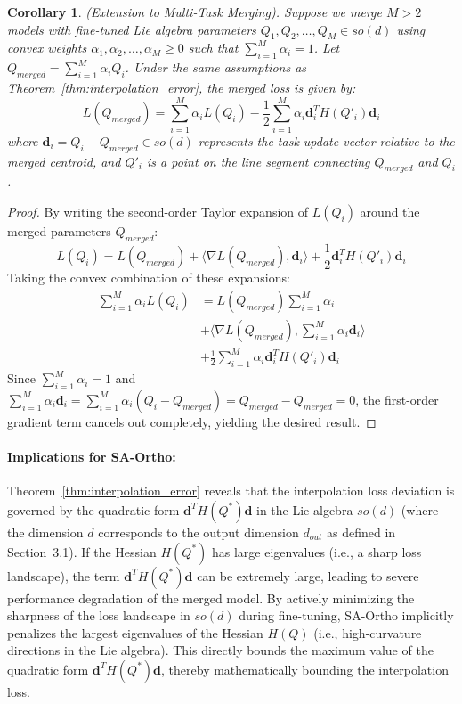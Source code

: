 \documentclass{article}
\theoremstyle{plain}
\newtheorem{corollary}[theorem]{Corollary}
\theoremstyle{definition}
\theoremstyle{remark}
\begin{document}
\begin{corollary}
\label{cor:multi_task_merging}
(Extension to Multi-Task Merging). Suppose we merge $M > 2$ models with fine-tuned Lie algebra parameters $Q_1, Q_2, \ldots, Q_M \in so(d)$ using convex weights $\alpha_1, \alpha_2, \ldots, \alpha_M \ge 0$ such that $\sum_{i=1}^M \alpha_i = 1$. Let $Q_{merged} = \sum_{i=1}^M \alpha_i Q_i$. Under the same assumptions as Theorem~\ref{thm:interpolation_error}, the merged loss is given by:
\begin{equation}
    L(Q_{merged}) = \sum_{i=1}^M \alpha_i L(Q_i) - \frac{1}{2} \sum_{i=1}^M \alpha_i \mathbf{d}_i^T H(Q'_i) \mathbf{d}_i
\end{equation}
where $\mathbf{d}_i = Q_i - Q_{merged} \in so(d)$ represents the task update vector relative to the merged centroid, and $Q'_i$ is a point on the line segment connecting $Q_{merged}$ and $Q_i$.
\end{corollary}

\begin{proof}
By writing the second-order Taylor expansion of $L(Q_i)$ around the merged parameters $Q_{merged}$:
\begin{equation}
    L(Q_i) = L(Q_{merged}) + \langle \nabla L(Q_{merged}), \mathbf{d}_i \rangle + \frac{1}{2} \mathbf{d}_i^T H(Q'_i) \mathbf{d}_i
\end{equation}
Taking the convex combination of these expansions:
\begin{align}
    \sum_{i=1}^M \alpha_i L(Q_i) &= L(Q_{merged}) \sum_{i=1}^M \alpha_i \nonumber \\
    &+ \langle \nabla L(Q_{merged}), \sum_{i=1}^M \alpha_i \mathbf{d}_i \rangle \nonumber \\
    &+ \frac{1}{2} \sum_{i=1}^M \alpha_i \mathbf{d}_i^T H(Q'_i) \mathbf{d}_i
\end{align}
Since $\sum_{i=1}^M \alpha_i = 1$ and $\sum_{i=1}^M \alpha_i \mathbf{d}_i = \sum_{i=1}^M \alpha_i (Q_i - Q_{merged}) = Q_{merged} - Q_{merged} = 0$, the first-order gradient term cancels out completely, yielding the desired result.
\end{proof}

\paragraph{Implications for SA-Ortho:} 
Theorem~\ref{thm:interpolation_error} reveals that the interpolation loss deviation is governed by the quadratic form $\mathbf{d}^T H(Q^*) \mathbf{d}$ in the Lie algebra $so(d)$ (where the dimension $d$ corresponds to the output dimension $d_{out}$ as defined in Section~3.1). If the Hessian $H(Q^*)$ has large eigenvalues (i.e., a sharp loss landscape), the term $\mathbf{d}^T H(Q^*) \mathbf{d}$ can be extremely large, leading to severe performance degradation of the merged model. By actively minimizing the sharpness of the loss landscape in $so(d)$ during fine-tuning, SA-Ortho implicitly penalizes the largest eigenvalues of the Hessian $H(Q)$ (i.e., high-curvature directions in the Lie algebra). This directly bounds the maximum value of the quadratic form $\mathbf{d}^T H(Q^*) \mathbf{d}$, thereby mathematically bounding the interpolation loss.
\end{document}
